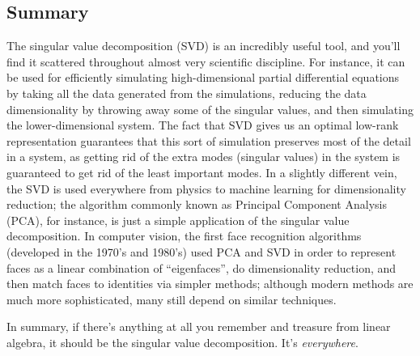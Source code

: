 \documentclass[11pt]{article}
\begin{document}
\subsection*{Summary}
The singular value decomposition (SVD) is an incredibly useful tool, and you'll find it scattered
throughout almost very scientific discipline. For instance, it can be used for efficiently
simulating high-dimensional partial differential equations by taking all the data generated from the
simulations, reducing the data dimensionality by throwing away some of the singular values, and then
simulating the lower-dimensional system. The fact that SVD gives us an optimal low-rank
representation guarantees that this sort of simulation preserves most of the detail in a system, as
getting rid of the extra modes (singular values) in the system is guaranteed to get rid of the least
important modes. In a slightly different vein, the SVD is used everywhere from physics to machine
learning for dimensionality reduction; the algorithm commonly known as Principal Component Analysis
(PCA), for instance, is just a simple application of the singular value decomposition. In computer
vision, the first face recognition algorithms (developed in the 1970's and 1980's) used PCA and SVD
in order to represent faces as a linear combination of ``eigenfaces'', do dimensionality
reduction, and then match faces to identities via simpler methods; although modern methods are much
more sophisticated, many still depend on similar techniques.

In summary, if there's anything at all you remember and treasure from linear algebra, it should be
the singular value decomposition. It's \emph{everywhere}.
\end{document}
